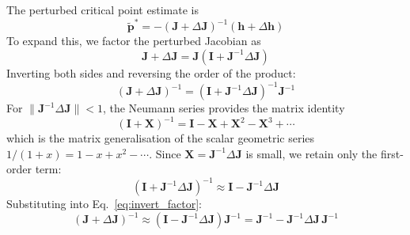 \documentclass[lettersize,journal]{IEEEtran}
\begin{document}
The perturbed critical point estimate is
\begin{equation}
    \tilde{\mathbf{p}}^* = -(\mathbf{J} + \Delta\mathbf{J})^{-1}(\mathbf{h} + \Delta\mathbf{h})
    \label{eq:perturbed_pstar}
\end{equation}
To expand this, we factor the perturbed Jacobian as
\begin{equation}
    \mathbf{J} + \Delta\mathbf{J} = \mathbf{J}\!\left(\mathbf{I} + \mathbf{J}^{-1}\Delta\mathbf{J}\right)
    \label{eq:factor_J}
\end{equation}
Inverting both sides and reversing the order of the product:
\begin{equation}
    (\mathbf{J} + \Delta\mathbf{J})^{-1} = \left(\mathbf{I} + \mathbf{J}^{-1}\Delta\mathbf{J}\right)^{-1}\mathbf{J}^{-1}
    \label{eq:invert_factor}
\end{equation}
For $\|\mathbf{J}^{-1}\Delta\mathbf{J}\| < 1$, the Neumann series provides the matrix identity
\begin{equation}
    \left(\mathbf{I} + \mathbf{X}\right)^{-1} = \mathbf{I} - \mathbf{X} + \mathbf{X}^2 - \mathbf{X}^3 + \cdots
    \label{eq:neumann}
\end{equation}
which is the matrix generalisation of the scalar geometric series $1/(1+x) = 1 - x + x^2 - \cdots$. Since $\mathbf{X} = \mathbf{J}^{-1}\Delta\mathbf{J}$ is small, we retain only the first-order term:
\begin{equation}
    \left(\mathbf{I} + \mathbf{J}^{-1}\Delta\mathbf{J}\right)^{-1} \approx \mathbf{I} - \mathbf{J}^{-1}\Delta\mathbf{J}
    \label{eq:neumann_approx}
\end{equation}
Substituting into Eq.~\eqref{eq:invert_factor}:
\begin{equation}
    (\mathbf{J} + \Delta\mathbf{J})^{-1} \approx \left(\mathbf{I} - \mathbf{J}^{-1}\Delta\mathbf{J}\right)\mathbf{J}^{-1} = \mathbf{J}^{-1} - \mathbf{J}^{-1}\Delta\mathbf{J}\,\mathbf{J}^{-1}
    \label{eq:first_order_inv}
\end{equation}
\end{document}
